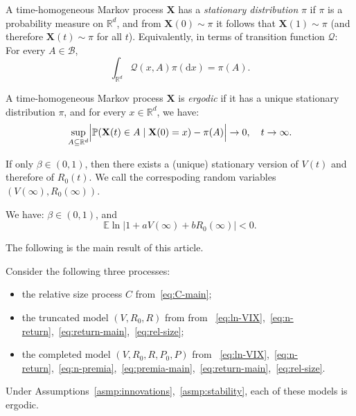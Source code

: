 \documentclass[12pt]{amsart}
\begin{document}
\begin{defn} A time-homogeneous Markov process $\mathbf{X}$ has a {\it stationary distribution} $\pi$ if $\pi$ is a probability measure on 
$\mathbb R^d$, and from $\mathbf{X}(0) \sim \pi$ it follows that $\mathbf{X}(1) \sim \pi$ (and therefore $\mathbf{X}(t) \sim \pi$ for all $t$). Equivalently, in terms of transition function $\mathcal Q$: For every $A \in \mathcal B$, 
$$
\int_{\mathbb R^d}\mathcal Q(x, A)\pi(\mathrm{d}x) = \pi(A).
$$
\end{defn}

\begin{defn} A time-homogeneous Markov process $\mathbf{X}$ is {\it ergodic} if it has a unique stationary distribution $\pi$, and for every $x \in \mathbb R^d$, we have:
$$
\sup\limits_{A \subseteq \mathbb R^d}\Bigl|\mathbb P(\mathbf{X}(t) \in A\mid \mathbf{X}(0) = x) - \pi(A)\Bigr| \to 0,\quad t \to \infty.
$$
\end{defn}

If only $\beta \in (0, 1)$, then there exists a (unique) stationary version of $V(t)$ and therefore of $R_0(t)$. We call the correspoding random variables $(V(\infty), R_0(\infty))$. 

\begin{asmp} We have: $\beta \in (0, 1)$, and 
\begin{equation}
\label{eq:log-negative}
\mathbb E\ln|1 + aV(\infty) + bR_0(\infty)| < 0.
\end{equation}
\label{asmp:stability}
\end{asmp}

The following is the main result of this article.

\begin{theorem}
Consider the following three processes: \begin{itemize}
\item the relative size process $C$ from~\eqref{eq:C-main};
\item the truncated model $(V, R_0, R)$ from from ~\eqref{eq:ln-VIX},~\eqref{eq:n-return},~\eqref{eq:return-main},~\eqref{eq:rel-size};
\item the completed model $(V, R_0, R, P_0, P)$ from ~\eqref{eq:ln-VIX},~\eqref{eq:n-return},~\eqref{eq:n-premia},~\eqref{eq:premia-main},~\eqref{eq:return-main},~\eqref{eq:rel-size}.
\end{itemize}
Under Assumptions~\ref{asmp:innovations},~\ref{asmp:stability}, each of these models is ergodic. 
\label{thm:main} 
\end{theorem}
\end{document}
